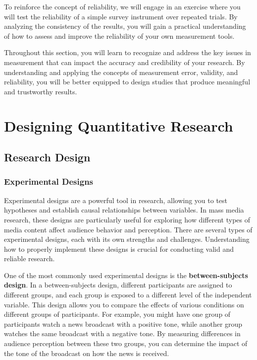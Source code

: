 \documentclass[
]{book}
\begin{document}
To reinforce the concept of reliability, we will engage in an exercise where you will test the reliability of a simple survey instrument over repeated trials. By analyzing the consistency of the results, you will gain a practical understanding of how to assess and improve the reliability of your own measurement tools.

Throughout this section, you will learn to recognize and address the key issues in measurement that can impact the accuracy and credibility of your research. By understanding and applying the concepts of measurement error, validity, and reliability, you will be better equipped to design studies that produce meaningful and trustworthy results.

\chapter{Designing Quantitative Research}\label{designing-quantitative-research}

\section{Research Design}\label{research-design}

\subsection{Experimental Designs}\label{experimental-designs}

Experimental designs are a powerful tool in research, allowing you to test hypotheses and establish causal relationships between variables. In mass media research, these designs are particularly useful for exploring how different types of media content affect audience behavior and perception. There are several types of experimental designs, each with its own strengths and challenges. Understanding how to properly implement these designs is crucial for conducting valid and reliable research.

One of the most commonly used experimental designs is the \textbf{between-subjects design}. In a between-subjects design, different participants are assigned to different groups, and each group is exposed to a different level of the independent variable. This design allows you to compare the effects of various conditions on different groups of participants. For example, you might have one group of participants watch a news broadcast with a positive tone, while another group watches the same broadcast with a negative tone. By measuring differences in audience perception between these two groups, you can determine the impact of the tone of the broadcast on how the news is received.
\end{document}
